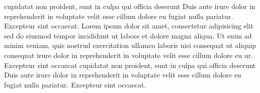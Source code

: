 \documentclass[a4paper, oneside, notitlepage, 12pt]{article}
\begin{document}
\begin{pages}
\begin{Leftside}
cupidatat non proident, sunt in culpa qui officia deserunt
Duis aute irure dolor in reprehenderit
in voluptate velit esse cillum dolore eu fugiat nulla
pariatur. Excepteur sint occaecat.
\pend
{}
Lorem ipsum dolor sit amet, consectetur adipisicing elit
sed do eiusmod tempor incididunt ut labore et dolore
magna aliqua. Ut enim ad minim veniam, quis nostrud
exercitation ullamco laboris nisi
 consequat ut aliquip consequat\pend[\vskip 2ex]
 irure dolor in reprehenderit
in voluptate velit esse cillum dolore eu ur. Excepteur sint occaecat
cupidatat non proident, sunt in culpa qui officia deserunt
Duis aute irure dolor in reprehenderit
in voluptate velit esse cillum dolore eu fugiat nulla
pariatur. Excepteur sint occaecat.
\pend
\endnumbering
\end{Leftside}

\begin{Rightside}


\end{Rightside}
\end{pages}
\end{document}
